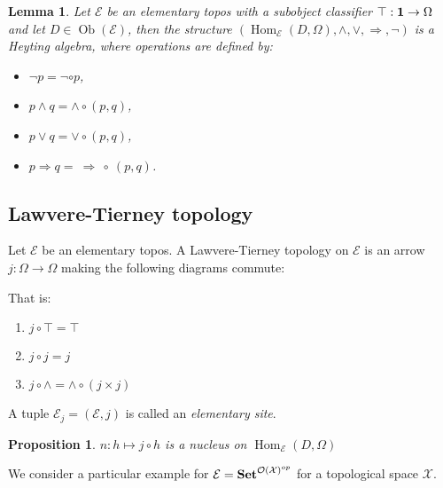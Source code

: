 \documentclass[a4paper]{article}
\theoremstyle{defin}
\theoremstyle{theorem}
\theoremstyle{claim}
\theoremstyle{prop}
\newtheorem{prop}{Proposition}
\theoremstyle{lemma}
\newtheorem{lemma}{Lemma}
\theoremstyle{fact}
\theoremstyle{ex}
\theoremstyle{col}
\begin{document}
\begin{lemma}
Let $\mathcal{E}$ be an elementary topos with a subobject classifier $\top : {\bf 1} \to \Omega$ and let $D \in \operatorname{Ob}(\mathcal{E})$, then the structure $(\operatorname{Hom}_{\mathcal{E}}(D, \Omega), \wedge, \vee, \Rightarrow, \neg)$ is a Heyting algebra, where operations are defined by:

\begin{itemize}
\item $\neg p = \neg \circ p$,
\item $p \wedge q = \wedge \circ (p, q)$,
\item $p \vee q = \vee \circ (p, q)$,
\item $p \Rightarrow q = \: \Rightarrow \: \circ \: (p, q)$.
\end{itemize}
\end{lemma}

\subsection{Lawvere-Tierney topology}

Let $\mathcal{E}$ be an elementary topos. A Lawvere-Tierney topology on $\mathcal{E}$ is an arrow $j : \Omega \to \Omega$ making the following diagrams commute:

\centerline{
}
That is:
\begin{enumerate}
\item $j \circ \top = \top$
\item $j \circ j = j$
\item $j \circ \wedge = \wedge \circ (j \times j)$
\end{enumerate}

A tuple $\mathcal{E}_j = (\mathcal{E}, j)$ is called an \emph{elementary site}.

\begin{prop}
$n : h \mapsto j \circ h$ is a nucleus on $\operatorname{Hom}_\mathcal{E}(D, \Omega)$
\end{prop}

\vspace{\baselineskip}

We consider a particular example for $\mathcal{E} = {\bf Set}^{\mathcal{O}(\mathcal{X})^{op}}$ for a topological space $\mathcal{X}$.
\end{document}
